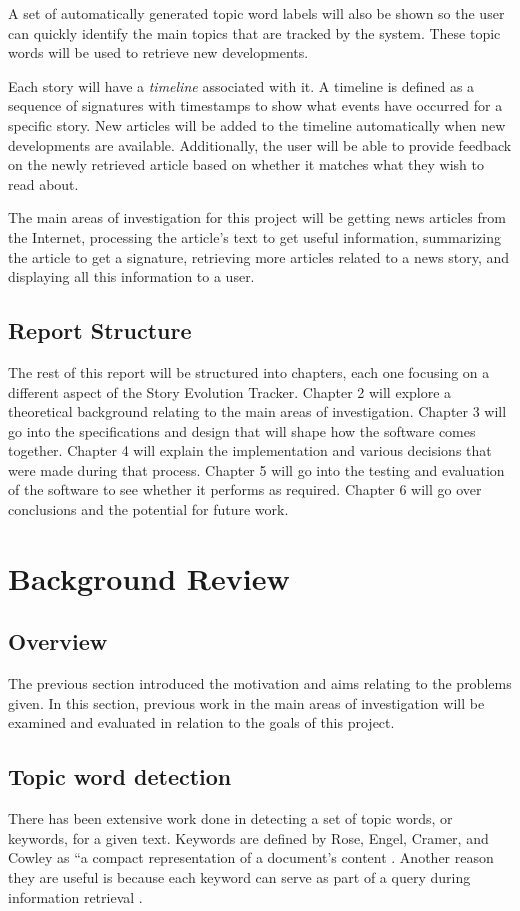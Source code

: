 \documentclass[11pt,titlepage]{report}
\begin{document}
A set of automatically generated topic word labels will also be shown so the user can quickly identify the main topics that are tracked by the system. These topic words will be used to retrieve new developments. 

Each story will have a \textit{timeline} associated with it. A timeline is defined as a sequence of signatures with timestamps to show what events have occurred for a specific story. New articles will be added to the timeline automatically when new developments are available. Additionally, the user will be able to provide feedback on the newly retrieved article based on whether it matches what they wish to read about.

The main areas of investigation for this project will be getting news articles from the Internet, processing the article's text to get useful information, summarizing the article to get a signature, retrieving more articles related to a news story, and displaying all this information to a user.

\section{Report Structure}
The rest of this report will be structured into chapters, each one focusing on a different aspect of the Story Evolution Tracker. Chapter 2 will explore a theoretical background relating to the main areas of investigation. Chapter 3 will go into the specifications and design that will shape how the software comes together. Chapter 4 will explain the implementation and various decisions that were made during that process. Chapter 5 will go into the testing and evaluation of the software to see whether it performs as required. Chapter 6 will go over conclusions and the potential for future work.


\chapter{Background Review}
\section{Overview}
The previous section introduced the motivation and aims relating to the problems given. In this section, previous work in the main areas of investigation will be examined and evaluated in relation to the goals of this project.
\section{Topic word detection}
There has been extensive work done in detecting a set of topic words, or keywords, for a given text. Keywords are defined by Rose, Engel, Cramer, and Cowley as “a compact representation of a document’s content \cite{RAKE}. Another reason they are useful is because each keyword can serve as part of a query during information retrieval \cite{RAKE}.
\end{document}

